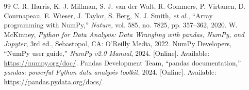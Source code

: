\documentclass[a4paper,oneside,12pt]{report}
\renewcommand{\bibname}{Daftar Pustaka}
\begin{document}
\renewcommand{\bibname}{Daftar Pustaka}
\begin{thebibliography}{99}
     C. R. Harris, K. J. Millman, S. J. van der Walt, R. Gommers, P. Virtanen, D. Cournapeau, E. Wieser, J. Taylor, S. Berg, N. J. Smith, \textit{et al.}, ``Array programming with NumPy,'' \textit{Nature}, vol. 585, no. 7825, pp. 357--362, 2020.
     W. McKinney, \textit{Python for Data Analysis: Data Wrangling with pandas, NumPy, and Jupyter}, 3rd ed., Sebastopol, CA: O'Reilly Media, 2022.
     NumPy Developers, ``NumPy user guide,'' \textit{NumPy v2.0 Manual}, 2024. [Online]. Available: \url{https://numpy.org/doc/}.
     Pandas Development Team, ``pandas documentation,'' \textit{pandas: powerful Python data analysis toolkit}, 2024. [Online]. Available: \url{https://pandas.pydata.org/docs/}.
\end{thebibliography}
\end{document}
